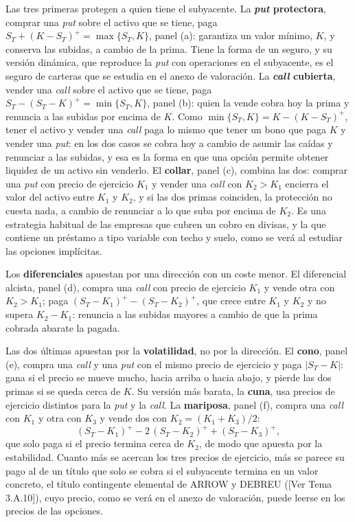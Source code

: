 \documentclass[10pt,a4paper]{article}
\newcommand{\authorfont}[1]{{\fontfamily{EBGaramond-TLF}\selectfont #1}}
\newcounter{anexo}
\begin{document}
Las tres primeras protegen a quien tiene el subyacente. La \textbf{\textit{put} protectora}, comprar una \textit{put} sobre el activo que se tiene, paga $S_T+(K-S_T)^+=\max\{S_T,K\}$, panel (a): garantiza un valor mínimo, $K$, y conserva las subidas, a cambio de la prima. Tiene la forma de un seguro, y su versión dinámica, que reproduce la \textit{put} con operaciones en el subyacente, es el seguro de carteras que se estudia en el anexo de valoración. La \textbf{\textit{call} cubierta}, vender una \textit{call} sobre el activo que se tiene, paga $S_T-(S_T-K)^+=\min\{S_T,K\}$, panel (b): quien la vende cobra hoy la prima y renuncia a las subidas por encima de $K$. Como $\min\{S_T,K\}=K-(K-S_T)^+$, tener el activo y vender una \textit{call} paga lo mismo que tener un bono que paga $K$ y vender una \textit{put}: en los dos casos se cobra hoy a cambio de asumir las caídas y renunciar a las subidas, y esa es la forma en que una opción permite obtener liquidez de un activo sin venderlo. El \textbf{collar}, panel (c), combina las dos: comprar una \textit{put} con precio de ejercicio $K_1$ y vender una \textit{call} con $K_2>K_1$ encierra el valor del activo entre $K_1$ y $K_2$, y si las dos primas coinciden, la protección no cuesta nada, a cambio de renunciar a lo que suba por encima de $K_2$. Es una estrategia habitual de las empresas que cubren un cobro en divisas, y la que contiene un préstamo a tipo variable con techo y suelo, como se verá al estudiar las opciones implícitas.

Los \textbf{diferenciales} apuestan por una dirección con un coste menor. El diferencial alcista, panel (d), compra una \textit{call} con precio de ejercicio $K_1$ y vende otra con $K_2>K_1$; paga $(S_T-K_1)^+-(S_T-K_2)^+$, que crece entre $K_1$ y $K_2$ y no supera $K_2-K_1$: renuncia a las subidas mayores a cambio de que la prima cobrada abarate la pagada.

Las dos últimas apuestan por la \textbf{volatilidad}, no por la dirección. El \textbf{cono}, panel (e), compra una \textit{call} y una \textit{put} con el mismo precio de ejercicio y paga $|S_T-K|$: gana si el precio se mueve mucho, hacia arriba o hacia abajo, y pierde las dos primas si se queda cerca de $K$. Su versión más barata, la \textbf{cuna}, usa precios de ejercicio distintos para la \textit{put} y la \textit{call}. La \textbf{mariposa}, panel (f), compra una \textit{call} con $K_1$ y otra con $K_3$ y vende dos con $K_2=(K_1+K_3)/2$:
$$(S_T-K_1)^+-2\,(S_T-K_2)^++(S_T-K_3)^+,$$
que solo paga si el precio termina cerca de $K_2$, de modo que apuesta por la estabilidad. Cuanto más se acercan los tres precios de ejercicio, más se parece su pago al de un título que solo se cobra si el subyacente termina en un valor concreto, el título contingente elemental de ARROW y DEBREU ([\authorfont{Ver Tema 3.A.10}]), cuyo precio, como se verá en el anexo de valoración, puede leerse en los precios de las opciones.
\end{document}
